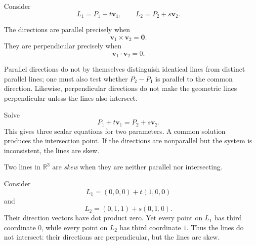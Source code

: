 Consider
\[
L_1=P_1+t\mathbf v_1,
\qquad
L_2=P_2+s\mathbf v_2.
\]

\begin{theorembox}
The directions are parallel precisely when
\[
\boxed{\mathbf v_1\times\mathbf v_2=\mathbf0}.
\]
They are perpendicular precisely when
\[
\boxed{\mathbf v_1\cdot\mathbf v_2=0}.
\]
\end{theorembox}

\begin{remarkbox}
Parallel directions do not by themselves distinguish identical lines from
distinct parallel lines; one must also test whether $P_2-P_1$ is parallel to the
common direction. Likewise, perpendicular directions do not make the geometric
lines perpendicular unless the lines also intersect.
\end{remarkbox}

\begin{derivationbox}
Solve
\[
P_1+t\mathbf v_1=P_2+s\mathbf v_2.
\]
This gives three scalar equations for two parameters. A common solution produces
the intersection point. If the directions are nonparallel but the system is
inconsistent, the lines are skew.
\end{derivationbox}

\begin{definitionbox}
Two lines in $\mathbb R^3$ are \emph{skew} when they are neither parallel nor
intersecting.
\end{definitionbox}

\begin{examplebox}
Consider
\[
L_1=(0,0,0)+t(1,0,0)
\]
and
\[
L_2=(0,1,1)+s(0,1,0).
\]
Their direction vectors have dot product zero. Yet every point on $L_1$ has
third coordinate $0$, while every point on $L_2$ has third coordinate $1$.
Thus the lines do not intersect: their directions are perpendicular, but the
lines are skew.
\end{examplebox}

\begin{center}
\end{center}


